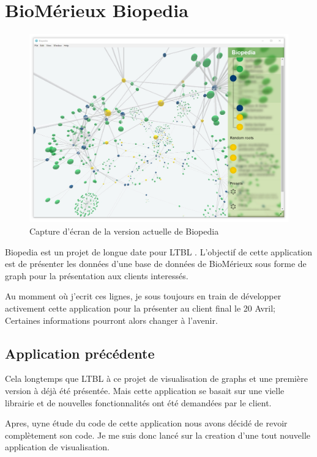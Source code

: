\section{BioMérieux Biopedia}
\label{biomerieuxBiopedia}

\begin{figure}[h]
    \centering
    \includegraphics[scale=0.35]{img/Biopedia.jpg}
    \caption{Capture d'écran de la version actuelle de Biopedia}
\end{figure}

Biopedia est un projet de longue date pour LTBL .
L'objectif de cette application est de présenter les données d'une base de données de BioMérieux sous forme de graph pour la présentation aux clients interessés.

Au momment où j'ecrit ces lignes, je sous toujours en train de développer activement cette application pour la présenter au client final le 20 Avril;
Certaines informations pourront alors changer à l'avenir.

\subsection{Application précédente}
\label{biomerieuxBiopediaApplicationPrécédente}

Cela longtemps que LTBL à ce projet de visualisation de graphs et une première version à déjà été présentée.
Mais cette application se basait sur une vielle librairie et de nouvelles fonctionnalités ont été demandées par le client.

Apres, uyne étude du code de cette application nous avons décidé de revoir complètement son code.
Je me suis donc lancé sur la creation d'une tout nouvelle application de visualisation.

